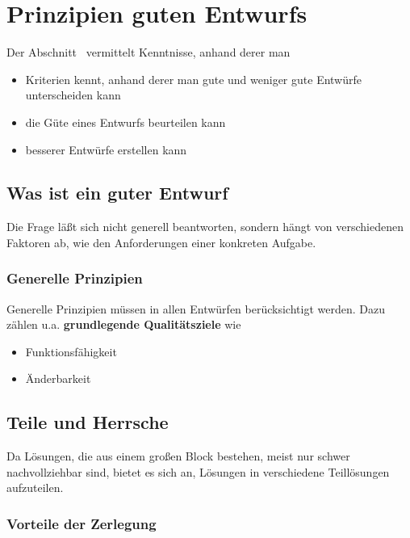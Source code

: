 \section{Prinzipien guten Entwurfs}\label{sec:prinzipien-guten-entwurfs}

Der Abschnitt~\cite[69, 3.7 Prinzipien guten Entwurfs]{Wed09b} vermittelt Kenntnisse, anhand derer man

\begin{itemize}
    \item Kriterien kennt, anhand derer man gute und weniger gute Entwürfe unterscheiden kann
    \item die Güte eines Entwurfs beurteilen kann
    \item besserer Entwürfe erstellen kann
\end{itemize}

\subsection{Was ist ein guter Entwurf}

Die Frage läßt sich nicht generell beantworten, sondern hängt von verschiedenen Faktoren ab, wie den Anforderungen einer konkreten Aufgabe.\\

\subsubsection*{Generelle Prinzipien}

Generelle Prinzipien müssen in allen Entwürfen berücksichtigt werden.
Dazu zählen u.a. \textbf{grundlegende Qualitätsziele} wie

\begin{itemize}
    \item Funktionsfähigkeit
    \item Änderbarkeit
\end{itemize}

\subsection{Teile und Herrsche}
Da Lösungen, die aus einem großen Block bestehen, meist nur schwer nachvollziehbar sind, bietet es sich an, Lösungen in verschiedene Teillösungen aufzuteilen.

\subsubsection*{Vorteile der Zerlegung}

